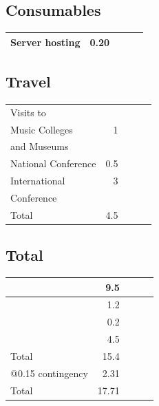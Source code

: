\documentclass{tufte-handout}
\begin{document}
\subsection{Consumables}
\label{sec-1-3}



\begin{center}
\begin{tabular}{lrlll}
\hline
 Server hosting  &  0.20  &     &     &     \\
\hline
\end{tabular}
\end{center}
\subsection{Travel}
\label{sec-1-4}



\begin{center}
\begin{tabular}{lrlll}
\hline
 Visits to            &       &     &     &     \\
 Music Colleges       &    1  &     &     &     \\
 and Museums          &       &     &     &     \\
\hline
 National Conference  &  0.5  &     &     &     \\
\hline
 International        &    3  &     &     &     \\
 Conference           &       &     &     &     \\
\hline
 Total                &  4.5  &     &     &     \\
\hline
\end{tabular}
\end{center}
\subsection{Total}
\label{sec-1-5}



\begin{center}
\begin{tabular}{lrlll}
\hline
                    &    9.5  &     &     &     \\
\hline
                    &    1.2  &     &     &     \\
\hline
                    &    0.2  &     &     &     \\
\hline
                    &    4.5  &     &     &     \\
\hline
 Total              &   15.4  &     &     &     \\
\hline
 @0.15 contingency  &   2.31  &     &     &     \\
\hline
 Total              &  17.71  &     &     &     \\
\hline
\end{tabular}
\end{center}
\end{document}
